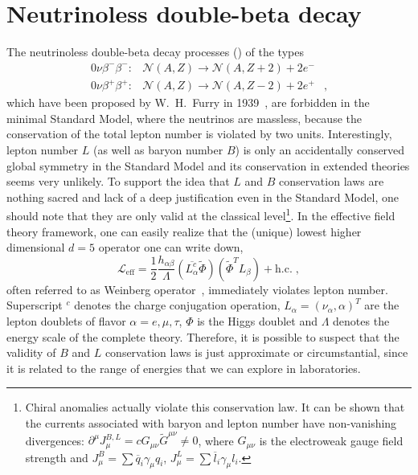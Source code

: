 \section{Neutrinoless double-beta decay}\label{sec:nbb:0nbb}

The neutrinoless double-beta decay processes (\onbb) of the types
\[
  \begin{array}{lrl}
    0\nu\beta^-\beta^-: &
      \mathcal{N}(A,Z) \longrightarrow \mathcal{N}(A,Z+2)+2e^- & \\
    0\nu\beta^+\beta^+: &
      \mathcal{N}(A,Z) \longrightarrow \mathcal{N}(A,Z-2)+2e^+ &,
  \end{array}
\]
which have been proposed by W.~H.~Furry in 1939~\cite{Furry1939}, are forbidden
in the minimal Standard Model, where the neutrinos are massless, because the
conservation of the total lepton number is violated by two units.
Interestingly, lepton number $L$ (as well as baryon number $B$) is only an
accidentally conserved global symmetry in the Standard Model and its
conservation in extended theories seems very unlikely. To support the idea that
$L$ and $B$ conservation laws are nothing sacred and lack of a deep
justification even in the Standard Model, one should note that they are only
valid at the classical level\footnote{Chiral anomalies actually violate this
conservation law. It can be shown that the currents associated with baryon
and lepton number have non-vanishing divergences: $\partial^\mu J_\mu^{B,L} =
c G_{\mu\nu} \widetilde{G}^{\mu\nu} \neq 0$, where $G_{\mu\nu}$ is the
electroweak gauge field strength and $J_\mu^B = \sum \overline{q}_i \gamma_\mu
q_i$, $J_\mu^L = \sum \overline{l}_i \gamma_\mu l_i$.}. In the effective field
theory framework, one can easily realize that the (unique) lowest higher dimensional
$d=5$ operator one can write down,
\[
  \mathcal{L}_\text{eff} = \frac{1}{2} \frac{h_{\alpha\beta}}{\Lambda}
                           (\overline{L_\alpha^c}\widetilde{\Phi})
                           (\widetilde{\Phi}^T L_\beta) + \text{h.c.} \;,
\]
often referred to as Weinberg operator~\cite{Weinberg1979}, immediately
violates lepton number. Superscript $^c$ denotes the charge conjugation
operation, $L_\alpha = (\nu_\alpha, \alpha)^T$ are the lepton doublets of
flavor $\alpha = e, \mu, \tau$, $\Phi$ is the Higgs doublet and $\Lambda$
denotes the energy scale of the complete theory. Therefore, it
is possible to suspect that the validity of $B$ and $L$ conservation laws is
just approximate or circumstantial, since it is related to the range of
energies that we can explore in laboratories.

